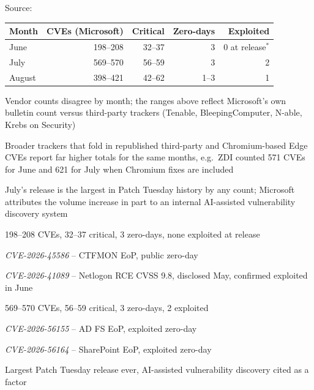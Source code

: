 \documentclass[Screen16to9,17pt]{foils}
\begin{document}
Source:\\ {\scriptsize
{}}



\begin{tabularx}{23cm}{Xrrrr}
Month & CVEs (Microsoft) & Critical & Zero-days & Exploited \\
\hline
June  & 198--208  & 32--37 & 3 & 0 at release$^{*}$ \\
July  & 569--570  & 56--59 & 3 & 2 \\
August & 398--421 & 42--62 & 1--3 & 1 \\
\end{tabularx}

\begin{list2}
\item Vendor counts disagree by month; the ranges above reflect Microsoft's own bulletin count versus third-party trackers (Tenable, BleepingComputer, N-able, Krebs on Security)
\item Broader trackers that fold in republished third-party and Chromium-based Edge CVEs report far higher totals for the same months, e.g.\ ZDI counted 571 CVEs for June and 621 for July when Chromium fixes are included
\item July's release is the largest in Patch Tuesday history by any count; Microsoft attributes the volume increase in part to an internal AI-assisted vulnerability discovery system
\end{list2}

\begin{list2}
\item 198--208 CVEs, 32--37 critical, 3 zero-days, none exploited at release
\item \emph{CVE-2026-45586} -- CTFMON EoP, public zero-day
\item \emph{CVE-2026-41089} -- Netlogon RCE CVSS 9.8, disclosed May, confirmed exploited in June
\end{list2}

\begin{list2}
\item 569--570 CVEs, 56--59 critical, 3 zero-days, 2 exploited
\item \emph{CVE-2026-56155} -- AD FS EoP, exploited zero-day
\item \emph{CVE-2026-56164} -- SharePoint EoP, exploited zero-day
\item Largest Patch Tuesday release ever, AI-assisted vulnerability discovery cited as a factor
\end{list2}
\end{document}
